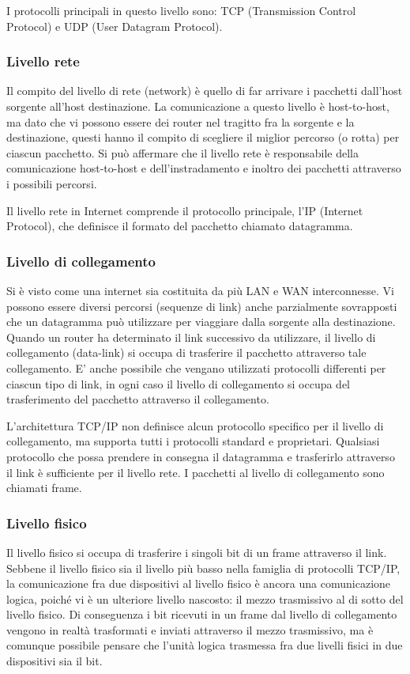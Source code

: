 I protocolli principali in questo livello sono: TCP (Transmission Control Protocol) e UDP (User Datagram Protocol).

\subsubsection*{Livello rete}
Il compito del livello di rete (network) è quello di far arrivare i pacchetti dall'host sorgente all'host destinazione. La comunicazione a questo livello è host-to-host, ma dato che vi possono essere dei router nel tragitto fra la sorgente e la destinazione, questi hanno il compito di scegliere il miglior percorso (o rotta) per ciascun pacchetto. Si può affermare che il livello rete è responsabile della comunicazione host-to-host e dell'instradamento e inoltro dei pacchetti attraverso i possibili percorsi. 

Il livello rete in Internet comprende il protocollo principale, l'IP (Internet Protocol), che definisce il formato del pacchetto chiamato datagramma.

\subsubsection*{Livello di collegamento}
Si è visto come una internet sia costituita da più LAN e WAN interconnesse. Vi possono essere diversi percorsi (sequenze di link) anche parzialmente sovrapposti che un datagramma può utilizzare per viaggiare dalla sorgente alla destinazione. Quando un router ha determinato il link successivo da utilizzare, il livello di collegamento (data-link) si occupa di trasferire il pacchetto attraverso tale collegamento. E' anche possibile che vengano utilizzati protocolli differenti per ciascun tipo di link, in ogni caso il livello di collegamento si occupa del trasferimento del pacchetto attraverso il collegamento.

L'architettura TCP/IP non definisce alcun protocollo specifico per il livello di collegamento, ma supporta tutti i protocolli standard e proprietari. Qualsiasi protocollo che possa prendere in consegna il datagramma e trasferirlo attraverso il link è sufficiente per il livello rete. I pacchetti al livello di collegamento sono chiamati frame.

\subsubsection*{Livello fisico}
Il livello fisico si occupa di trasferire i singoli bit di un frame attraverso il link. Sebbene il livello fisico sia il livello più basso nella famiglia di protocolli TCP/IP, la comunicazione fra due dispositivi al livello fisico è ancora una comunicazione logica, poiché vi è un ulteriore livello nascosto: il mezzo trasmissivo al di sotto del livello fisico. Di conseguenza i bit ricevuti in un frame dal livello di collegamento vengono in realtà trasformati e inviati attraverso il mezzo trasmissivo, ma è comunque possibile pensare che l'unità logica trasmessa fra due livelli fisici in due dispositivi sia il bit.

